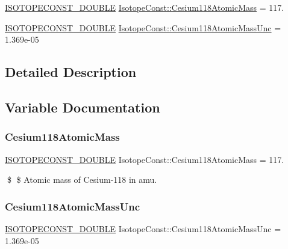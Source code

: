 \begin{DoxyCompactItemize}
\item 
\mbox{\hyperlink{group___isotope_const-_macros_ga8f45a7272ce02c0b4c65c44636ed719a}{I\+S\+O\+T\+O\+P\+E\+C\+O\+N\+S\+T\+\_\+\+D\+O\+U\+B\+LE}} \mbox{\hyperlink{group___isotope_const-_cesium-_cs118_ga9d6b2a0ed32c9148bd0020156a9b6f3a}{Isotope\+Const\+::\+Cesium118\+Atomic\+Mass}} = 117.
\item 
\mbox{\hyperlink{group___isotope_const-_macros_ga8f45a7272ce02c0b4c65c44636ed719a}{I\+S\+O\+T\+O\+P\+E\+C\+O\+N\+S\+T\+\_\+\+D\+O\+U\+B\+LE}} \mbox{\hyperlink{group___isotope_const-_cesium-_cs118_ga0e61101e7e9532b7b61b6d860e2f64aa}{Isotope\+Const\+::\+Cesium118\+Atomic\+Mass\+Unc}} = 1.\+369e-\/05
\end{DoxyCompactItemize}


\subsection{Detailed Description}


\subsection{Variable Documentation}
\mbox{\label{group___isotope_const-_cesium-_cs118_ga9d6b2a0ed32c9148bd0020156a9b6f3a}} 
\subsubsection{\texorpdfstring{Cesium118\+Atomic\+Mass}{Cesium118AtomicMass}}
{\footnotesize\ttfamily \mbox{\hyperlink{group___isotope_const-_macros_ga8f45a7272ce02c0b4c65c44636ed719a}{I\+S\+O\+T\+O\+P\+E\+C\+O\+N\+S\+T\+\_\+\+D\+O\+U\+B\+LE}} Isotope\+Const\+::\+Cesium118\+Atomic\+Mass = 117.}

\$ \$ Atomic mass of Cesium-\/118 in amu. \mbox{\label{group___isotope_const-_cesium-_cs118_ga0e61101e7e9532b7b61b6d860e2f64aa}} 
\subsubsection{\texorpdfstring{Cesium118\+Atomic\+Mass\+Unc}{Cesium118AtomicMassUnc}}
{\footnotesize\ttfamily \mbox{\hyperlink{group___isotope_const-_macros_ga8f45a7272ce02c0b4c65c44636ed719a}{I\+S\+O\+T\+O\+P\+E\+C\+O\+N\+S\+T\+\_\+\+D\+O\+U\+B\+LE}} Isotope\+Const\+::\+Cesium118\+Atomic\+Mass\+Unc = 1.\+369e-\/05}

